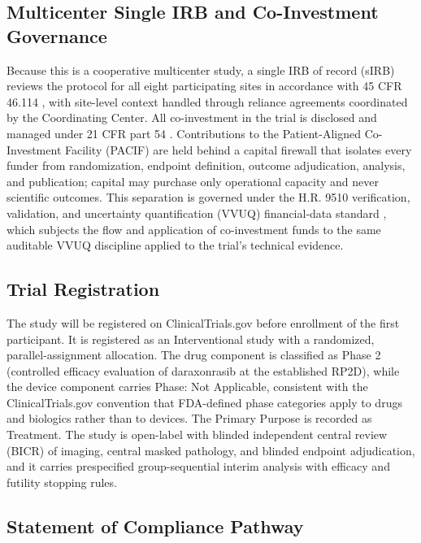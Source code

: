 \subsection{Multicenter Single IRB and Co-Investment Governance}

Because this is a cooperative multicenter study, a single IRB of record (sIRB)
reviews the protocol for all eight participating sites in accordance with 45 CFR
46.114 \cite{commonrule_sirb}, with site-level context handled through reliance
agreements coordinated by the Coordinating Center. All co-investment in the trial
is disclosed and managed under 21 CFR part 54 \cite{ecfr2026part54}. Contributions
to the Patient-Aligned Co-Investment Facility (PACIF) are held behind a capital
firewall that isolates every funder from randomization, endpoint definition,
outcome adjudication, analysis, and publication; capital may purchase only
operational capacity and never scientific outcomes. This separation is governed
under the H.R. 9510 verification, validation, and uncertainty quantification
(VVUQ) financial-data standard \cite{kawchak2026hr9510}, which subjects the flow
and application of co-investment funds to the same auditable VVUQ discipline
applied to the trial's technical evidence.

\subsection{Trial Registration}

The study will be registered on ClinicalTrials.gov before enrollment of the
first participant. It is registered as an Interventional study with a randomized,
parallel-assignment allocation. The drug component is classified as Phase 2
(controlled efficacy evaluation of daraxonrasib at the established RP2D), while
the device component carries Phase: Not Applicable, consistent with the
ClinicalTrials.gov convention that FDA-defined phase categories apply to drugs and
biologics rather than to devices. The Primary Purpose is recorded as Treatment.
The study is open-label with blinded independent central review (BICR) of imaging,
central masked pathology, and blinded endpoint adjudication, and it carries
prespecified group-sequential interim analysis with efficacy and futility
stopping rules.

\subsection{Statement of Compliance Pathway}

